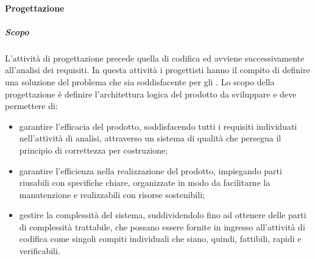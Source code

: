 			\paragraph {Progettazione}
				\subparagraph{Scopo}
					L'attività di progettazione precede quella di codifica ed avviene successivamente all'analisi dei requisiti.
					\newline
					In questa attività i progettisti hanno il compito di definire una soluzione del problema che sia soddisfacente per gli . 
					\newline
					Lo scopo della progettazione è definire l'architettura logica del prodotto da sviluppare e deve permettere di:
					\begin{itemize}
						\item garantire l'efficacia del prodotto, soddisfacendo tutti i requisiti individuati nell'attività di analisi, attraverso un sistema di qualità che persegua il principio di correttezza per costruzione;
						\item garantire l'efficienza nella realizzazione del prodotto, impiegando parti riusabili con specifiche chiare, organizzate in modo da facilitarne la manutenzione e realizzabili con risorse sostenibili;
						\item gestire la complessità del sistema, suddividendolo fino ad ottenere delle parti di complessità trattabile, che possano essere fornite in ingresso all'attività di codifica come singoli compiti individuali che siano, quindi, fattibili, rapidi e verificabili.
					\end{itemize}
				
